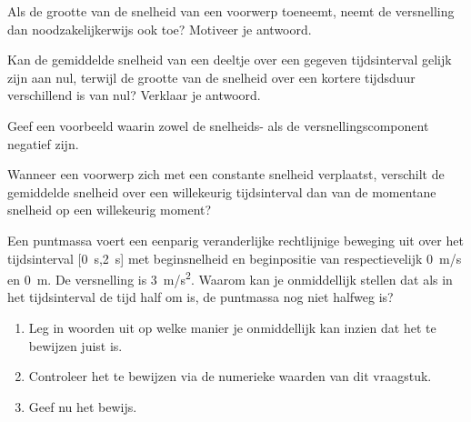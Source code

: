 \documentclass{ximera}
\begin{document}
	\author{Bart Lambregs}
    \xmsource\xmuitleg

\begin{exercise}
	Als de grootte van de snelheid van een voorwerp toeneemt, neemt de versnelling dan noodzakelijkerwijs ook toe? Motiveer je antwoord.
\end{exercise}

\begin{exercise}
	Kan de gemiddelde snelheid van een deeltje over een gegeven tijdsinterval gelijk zijn aan nul, terwijl de grootte van de snelheid over een kortere tijdsduur verschillend is van nul? Verklaar je antwoord.
\end{exercise}

\begin{exercise}
	Geef een voorbeeld waarin zowel de snelheids- als de versnellingscomponent negatief zijn.
\end{exercise}

\begin{exercise}
	Wanneer een voorwerp zich met een constante snelheid verplaatst, verschilt de gemiddelde snelheid over een willekeurig tijdsinterval dan van de momentane snelheid op een willekeurig moment?
\end{exercise}



\begin{exercise}
    Een puntmassa voert een eenparig veranderlijke rechtlijnige beweging uit over het tijdsinterval [\SI{0}{s},\SI{2}{s}] met beginsnelheid en beginpositie van respectievelijk \SI{0}{m/s} en \SI{0}{m}. De versnelling is \SI{3}{m/s^2}. Waarom kan je onmiddellijk stellen dat als in het tijdsinterval de tijd half om is, de puntmassa nog niet halfweg is?
    \begin{enumerate}
        \item Leg in woorden uit op welke manier je onmiddellijk kan inzien dat het te bewijzen juist is.
        \item Controleer het te bewijzen via de numerieke waarden van dit vraagstuk.
        \item Geef nu het bewijs.
    \end{enumerate}
\end{exercise}

\end{document}
